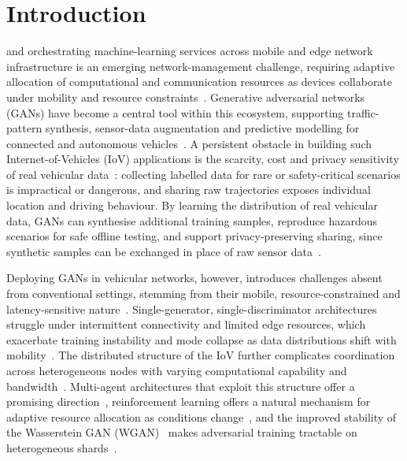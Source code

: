 \documentclass[journal]{IEEEtran}
\begin{document}
\section{Introduction}
 and orchestrating machine-learning services across
mobile and edge network infrastructure is an emerging network-management
challenge, requiring adaptive allocation of computational and communication
resources as devices collaborate under mobility and resource
constraints~\cite{pratap2023cotev}. Generative adversarial networks (GANs) have
become a central tool within this ecosystem, supporting traffic-pattern
synthesis, sensor-data augmentation and predictive modelling for connected and
autonomous vehicles~\cite{devika2024vadgan,zhang2023fedgan}. A persistent
obstacle in building such Internet-of-Vehicles (IoV) applications is the
scarcity, cost and privacy sensitivity of real vehicular
data~\cite{mishra2023dew,kaleibar2026semantic}: collecting labelled data for
rare or safety-critical scenarios is impractical or dangerous, and sharing raw
trajectories exposes individual location and driving behaviour. By learning the
distribution of real vehicular data, GANs can synthesise additional training
samples, reproduce hazardous scenarios for safe offline testing, and support
privacy-preserving sharing, since synthetic samples can be exchanged in place
of raw sensor data~\cite{mfogo2025ganaiipot,luo2025wgan,zaki2026mambavec}.

Deploying GANs in vehicular networks, however, introduces challenges absent
from conventional settings, stemming from their mobile, resource-constrained and
latency-sensitive nature~\cite{contreras2025genai,kaleibar2024clustering,hammoud2022fog}.
Single-generator, single-discriminator architectures struggle under intermittent
connectivity and limited edge resources, which exacerbate training instability
and mode collapse as data distributions shift with
mobility~\cite{yuan2020controller,karim2022architecture,elbir2022fl}. The
distributed structure of the IoV further complicates coordination across
heterogeneous nodes with varying computational capability and
bandwidth~\cite{wang2022joint,posner2021fl,kaleibar2025genetic}. Multi-agent
architectures that exploit this structure offer a promising
direction~\cite{quan2024fl,hazarika2023ris,xu2024caching,kaleibar2025mascots},
reinforcement learning offers a natural mechanism for adaptive resource
allocation as conditions change~\cite{liang2020rl,zaki2025cogroup}, and the
improved stability of the Wasserstein GAN (WGAN)~\cite{arjovsky2017wgan}
makes adversarial training tractable on heterogeneous shards~\cite{hua2019gan}.
\end{document}
